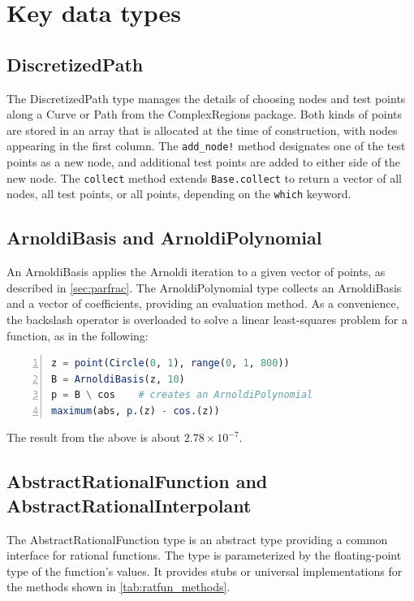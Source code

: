 \documentclass{juliacon}
\begin{document}
\section{Key data types}
\label{sec:types}

\subsection{DiscretizedPath}

The \textsf{DiscretizedPath} type manages the details of choosing nodes and test points along a \textsf{Curve} or \textsf{Path} from the \textsf{ComplexRegions} package. Both kinds of points are stored in an array that is allocated at the time of construction, with nodes appearing in the first column. The \verb|add_node!| method designates one of the test points as a new node, and additional test points are added to either side of the new node. The \verb|collect| method extends \verb|Base.collect| to return a vector of all nodes, all test points, or all points, depending on the \verb|which| keyword.

\subsection{ArnoldiBasis and ArnoldiPolynomial}

An \textsf{ArnoldiBasis} applies the Arnoldi iteration to a given vector of points, as described in \autoref{sec:parfrac}. The \textsf{ArnoldiPolynomial} type collects an \textsf{ArnoldiBasis} and a vector of coefficients, providing an evaluation method. As a convenience, the backslash operator is overloaded to solve a linear least-squares problem for a function, as in the following:
\begin{lstlisting}[language = Julia, numbers=left, label={lst:exmplg}, caption={Least-squares for an \textsf{ArnoldiBasis}.}]
z = point(Circle(0, 1), range(0, 1, 800))
B = ArnoldiBasis(z, 10)
p = B \ cos    # creates an ArnoldiPolynomial
maximum(abs, p.(z) - cos.(z))
\end{lstlisting}
The result from the above is about $2.78 \times 10^{-7}$. 

\subsection{AbstractRationalFunction and AbstractRationalInterpolant}

The \textsf{AbstractRationalFunction} type is an abstract type providing a common interface for rational functions. The type is parameterized by the floating-point type of the function's values. It provides stubs or universal implementations for the methods shown in \autoref{tab:ratfun_methods}. 
\end{document}
